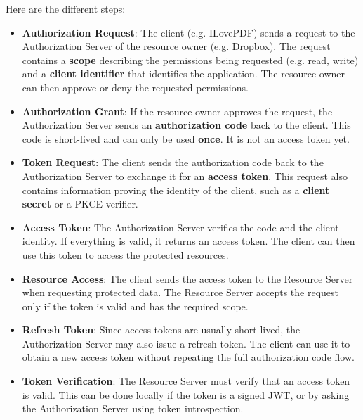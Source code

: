 Here are the different steps:
\begin{itemize} 
    \item \textbf{Authorization Request}: The client (e.g. ILovePDF) sends a request to the Authorization Server of the resource owner (e.g. Dropbox). The request contains a \textbf{scope} describing the permissions being requested (e.g. read, write) and a \textbf{client identifier} that identifies the application. The resource owner can then approve or deny the requested permissions. 
    
    \item \textbf{Authorization Grant}: If the resource owner approves the request, the Authorization Server sends an \textbf{authorization code} back to the client. This code is short-lived and can only be used \textbf{once}. It is not an access token yet. 
    
    \item \textbf{Token Request}: The client sends the authorization code back to the Authorization Server to exchange it for an \textbf{access token}. This request also contains information proving the identity of the client, such as a \textbf{client secret} or a PKCE verifier. 
    
    \item \textbf{Access Token}: The Authorization Server verifies the code and the client identity. If everything is valid, it returns an access token. The client can then use this token to access the protected resources.
    
    \item \textbf{Resource Access}: The client sends the access token to the Resource Server when requesting protected data. The Resource Server accepts the request only if the token is valid and has the required scope. 
    
    \item \textbf{Refresh Token}: Since access tokens are usually short-lived, the Authorization Server may also issue a refresh token. The client can use it to obtain a new access token without repeating the full authorization code flow. 
    
    \item \textbf{Token Verification}: The Resource Server must verify that an access token is valid. This can be done locally if the token is a signed JWT, or by asking the Authorization Server using token introspection. 

\end{itemize} 


